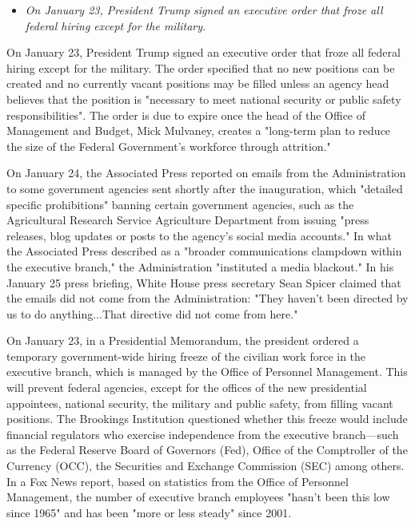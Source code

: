 \begin{itemize}
\item
  \emph{On January 23, President Trump signed an executive order that
  froze all federal hiring except for the military.}
\end{itemize}

On January 23, President Trump signed an executive order that froze all
federal hiring except for the military. The order specified that no new
positions can be created and no currently vacant positions may be filled
unless an agency head believes that the position is "necessary to meet
national security or public safety responsibilities". The order is due
to expire once the head of the Office of Management and Budget, Mick
Mulvaney, creates a "long-term plan to reduce the size of the Federal
Government's workforce through attrition."

On January 24, the Associated Press reported on emails from the
Administration to some government agencies sent shortly after the
inauguration, which "detailed specific prohibitions" banning certain
government agencies, such as the Agricultural Research Service
Agriculture Department from issuing "press releases, blog updates or
posts to the agency's social media accounts." In what the Associated
Press described as a "broader communications clampdown within the
executive branch," the Administration "instituted a media blackout." In
his January 25 press briefing, White House press secretary Sean Spicer
claimed that the emails did not come from the Administration: "They
haven't been directed by us to do anything...That directive did not come
from here."

On January 23, in a Presidential Memorandum, the president ordered a
temporary government-wide hiring freeze of the civilian work force in
the executive branch, which is managed by the Office of Personnel
Management. This will prevent federal agencies, except for the offices
of the new presidential appointees, national security, the military and
public safety, from filling vacant positions. The Brookings Institution
questioned whether this freeze would include financial regulators who
exercise independence from the executive branch---such as the Federal
Reserve Board of Governors (Fed), Office of the Comptroller of the
Currency (OCC), the Securities and Exchange Commission (SEC) among
others. In a Fox News report, based on statistics from the Office of
Personnel Management, the number of executive branch employees "hasn't
been this low since 1965" and has been "more or less steady" since 2001.

